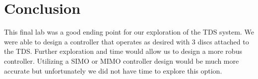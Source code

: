 \documentclass[11pt,titlepage]{article}
\begin{document}
\section{Conclusion}
    This final lab was a good ending point for our exploration of the TDS system. We were able to design a controller that operates as desired with 3 discs attached to the TDS. Further exploration and time would allow us to design a more robus controller. Utilizing a SIMO or MIMO controller design would be much more accurate but unfortunately we did not have time to explore this option.
\end{document}
